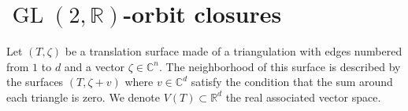 \documentclass[a4paper,12pt]{article}
\def\bC{\mathbb{C}}
\def\bR{\mathbb{R}}
\def\cA{\mathcal{A}}
\def\cE{\mathcal{E}}
\def\GL{\operatorname{GL}}
\begin{document}
%
%
%
%


%
%
%
%

\section{$\GL(2,\bR)$-orbit closures}
Let $(T, \zeta)$ be a translation surface made of a triangulation with edges
numbered from $1$ to $d$ and a vector $\zeta \in \bC^n$. The neighborhood
of this surface is described by the surfaces $(T, \zeta + v)$ where $v \in \bC^d$
satisfy the condition that the sum around each triangle is zero. We denote
$V(T) \subset \bR^d$ the real associated vector space.
\end{document}
